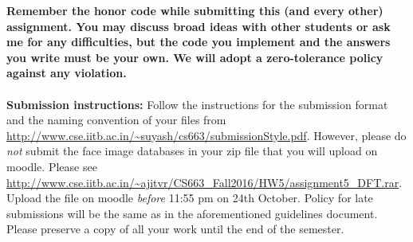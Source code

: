 \documentclass[11pt]{article}
\begin{document}
\maketitle

\textbf{Remember the honor code while submitting this (and every other) assignment. You may discuss broad ideas with other students or ask me for any difficulties, but the code you implement and the answers you write must be your own. We will adopt a \textbf{zero-tolerance policy} against any violation.}
\\
\\
\textbf{Submission instructions:} Follow the instructions for the submission format and the naming convention of your files from \url{http://www.cse.iitb.ac.in/~suyash/cs663/submissionStyle.pdf}. However, please do \emph{not} submit the face image databases in your zip file that you will upload on moodle. Please see \url{http://www.cse.iitb.ac.in/~ajitvr/CS663_Fall2016/HW5/assignment5_DFT.rar}. Upload the file on moodle \emph{before} 11:55 pm on 24th October. Policy for late submissions will be the same as in the aforementioned guidelines document. Please preserve a copy of all your work until the end of the semester. 
\end{document}
